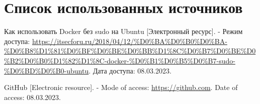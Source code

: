\documentclass[12pt, a4paper, simple]{eskdtext}
\begin{document}




  \newpage
  \begingroup
    \section*{Список использованных источников} %

    \renewcommand{\addcontentsline}[3]{}%
    \renewcommand{\section}[2]{}%

    \begin{thebibliography}{}

      Как использовать Docker без sudo на Ubuntu
      [Электронный ресурс]. -
      Режим доступа:
      \url{https://itsecforu.ru/2018/04/12/%D0%BA%D0%B0%D0%BA-%D0%B8%D1%81%D0%BF%D0%BE%D0%BB%D1%8C%D0%B7%D0%BE%D0%B2%D0%B0%D1%82%D1%8C-docker-%D0%B1%D0%B5%D0%B7-sudo-%D0%BD%D0%B0-ubuntu}.
      Дата доступа: 08.03.2023.

      GitHub
      [Electronic resource]. -
      Mode of access:
      \url{https://github.com}.
      Date of access: 08.03.2023.
    \end{thebibliography}
  \endgroup
\end{document}

